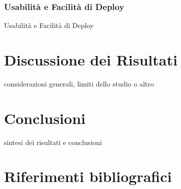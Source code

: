 \documentclass[12pt,a4paper,twoside]{book}
\begin{document}
\subsection{Usabilità e Facilità di Deploy}
Usabilità e Facilità di Deploy

\chapter{Discussione dei Risultati}
considerazioni generali, limiti dello studio o altro

\chapter{Conclusioni}
sintesi dei risultati e conclusioni

\renewcommand{\bibsection}{}
\chapter*{Riferimenti bibliografici}

\end{document}
